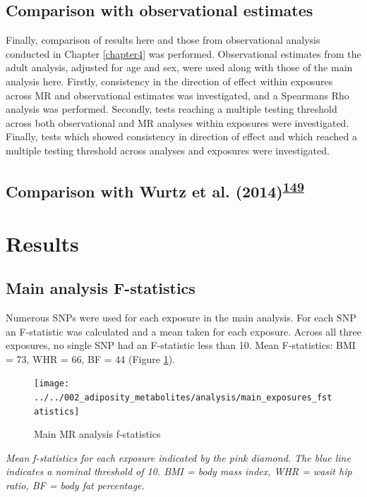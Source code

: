 \documentclass[11pt,twoside]{bristolthesis}
\newcommand{\bsmall}{\begin{small}}
\newcommand{\esmall}{\end{small}}
\begin{document}
\hypertarget{comparison-with-observational-estimates}{%
\subsection{Comparison with observational estimates}\label{comparison-with-observational-estimates}}

Finally, comparison of results here and those from observational analysis conducted in Chapter \ref{chapter4} was performed. Observational estimates from the adult analysis, adjusted for age and sex, were used along with those of the main analysis here. Firstly, consistency in the direction of effect within exposures across MR and observational estimates was investigated, and a Spearmans Rho analysis was performed. Secondly, tests reaching a multiple testing threshold across both observational and MR analyses within exposures were investigated. Finally, tests which showed consistency in direction of effect and which reached a multiple testing threshold across analyses and exposures were investigated.

\hypertarget{comparison-with-wurtz-et-al.-2014wurtz2014}{%
\subsection{\texorpdfstring{Comparison with Wurtz et al. (2014)\textsuperscript{\protect\hyperlink{ref-Wurtz2014}{149}}}{Comparison with Wurtz et al. (2014)149}}\label{comparison-with-wurtz-et-al.-2014wurtz2014}}

\hypertarget{results}{%
\section{Results}\label{results}}

\hypertarget{main-analysis-f-statistics}{%
\subsection{Main analysis F-statistics}\label{main-analysis-f-statistics}}

Numerous SNPs were used for each exposure in the main analysis. For each SNP an F-statistic was calculated and a mean taken for each exposure. Across all three exposures, no single SNP had an F-statistic less than 10. Mean F-statistics: BMI = 73, WHR = 66, BF = 44 (Figure \ref{fig:chapter5-figure-fstat-main}).
\begin{figure}
\texttt{[image: ../../002\_adiposity\_metabolites/analysis/main\_exposures\_fstatistics]} \caption{Main MR analysis f-statistics}\label{fig:chapter5-figure-fstat-main}
\end{figure}
\noindent 
\bsmall
\emph{Mean f-statistics for each exposure indicated by the pink diamond. The blue line indicates a nominal threshold of 10. BMI = body mass index, WHR = wasit hip ratio, BF = body fat percentage.}
\esmall
\end{document}
